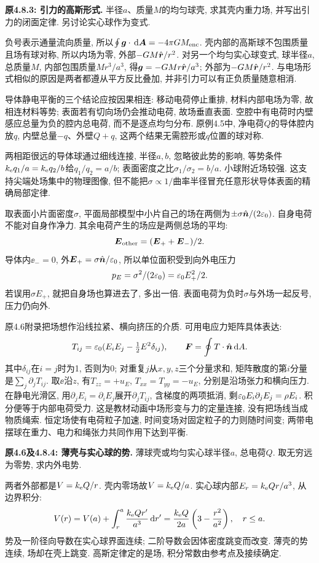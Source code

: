 \begin{example}
\textbf{原4.8.3: 引力的高斯形式.} 
半径$a$、质量$M$的均匀球壳, 求其壳内重力场, 并写出引力的闭面定律. 另讨论实心球作为变式.
\end{example}
\begin{solution}
负号表示通量流向质量, 所以$\oint\boldsymbol{g}\cdot\,\mathrm d\boldsymbol{A}=-4\pi GM_{\rm enc}$. 壳内部的高斯球不包围质量且场有球对称, 所以内场为零, 外部$-GM\hat{\boldsymbol{r}}/r^2$. 对另一个均匀实心球变式, 球半径$a$, 总质量$M$, 内部包围质量$Mr^3/a^3$, 得$\boldsymbol{g}=-GMr\hat{\boldsymbol{r}}/a^3$; 外部为$-GM\hat{\boldsymbol{r}}/r^2$. 与电场形式相似的原因是两者都遵从平方反比叠加, 并非引力可以有正负质量随意相消.
\end{solution}

\label{tb:electric-pressure}
导体静电平衡的三个结论应按因果相连: 移动电荷停止重排, 材料内部电场为零, 故相连材料等势; 表面若有切向场仍会推动电荷, 故场垂直表面. 空腔中有电荷时内壁感应总量为负的腔内总电荷, 而不是逐点均匀分布. 原例4.5中, 净电荷$Q$的导体腔内放$q$, 内壁总量$-q$、外壁$Q+q$, 这两个结果无需腔形或$q$位置的球对称.

两相距很远的导体球通过细线连接, 半径$a,b$, 忽略彼此势的影响, 等势条件$k_{\mathrm e} q_1/a=k_{\mathrm e} q_2/b$给$q_1/q_2=a/b$; 表面密度之比$\sigma_1/\sigma_2=b/a$. 小球附近场较强. 这支持尖端处场集中的物理图像, 但不能把$\sigma\propto1/\text{曲率半径}$冒充任意形状导体表面的精确局部定律.

取表面小片面密度$\sigma$, 平面局部模型中小片自己的场在两侧为$\pm\sigma\hat{\boldsymbol{n}}/(2\varepsilon_0)$. 自身电荷不能对自身作净力. 其余电荷产生的场应是两侧总场的平均:
\[\boldsymbol{E}_{\rm other}=(\boldsymbol{E}_++\boldsymbol{E}_-)/2.\]
导体内$\ee_-=0$, 外$\boldsymbol{E}_+=\sigma\hat{\boldsymbol{n}}/\varepsilon_0$, 所以单位面积受到向外电压力
\[p_E=\sigma^2/(2\varepsilon_0)=\varepsilon_0 E_+^2/2.\]
若误用$\sigma E_+$, 就把自身场也算进去了, 多出一倍. 表面电荷为负时$\sigma$与外场一起反号, 压力仍向外.

原4.6附录把场想作沿线拉紧、横向挤压的介质. 可用电应力矩阵具体表达:
\[T_{ij}=\varepsilon_0(E_iE_j-\tfrac12 E^2\delta_{ij}),\qquad
\boldsymbol{F}=\oint T\cdot\hat{\boldsymbol{n}}\,\mathrm d A.\]
其中$\delta_{ij}$在$i=j$时为1, 否则为0; 对重复$j$从$x,y,z$三个分量求和, 矩阵散度的第$i$分量是$\sum_j\partial_jT_{ij}$.
取$\ee$沿$z$, 有$T_{zz}=+u_E$, $T_{xx}=T_{yy}=-u_E$, 分别是沿场张力和横向压力. 在静电光滑区, 用$\partial_jE_i=\partial_iE_j$展开$\partial_jT_{ij}$, 含梯度的两项抵消, 剩$\varepsilon_0 E_i\partial_jE_j=\rho E_i$. 积分便等于内部电荷受力. 这是教材动画中场形变与力的定量连接, 没有把场线当成物质绳索. 恒定场使有电荷粒子加速, 时间变场对固定粒子的力则随时间变; 两带电摆球在重力、电力和绳张力共同作用下达到平衡.

\label{tb:charged-sphere}
\begin{example}
\textbf{原4.6及4.8.4: 薄壳与实心球的势.} 
薄球壳或均匀实心球半径$a$, 总电荷$Q$. 取无穷远为零势, 求内外电势.
\end{example}
\begin{solution}
两者外部都是$V=k_{\mathrm e} Q/r$. 壳内零场故$V=k_{\mathrm e} Q/a$. 实心球内部$E_r=k_{\mathrm e} Qr/a^3$, 从边界积分:
\[V(r)=V(a)+\int_r^a\frac{k_{\mathrm e} Qr'}{a^3}\,\mathrm d r'
=\frac{k_{\mathrm e} Q}{2a}\left(3-\frac{r^2}{a^2}\right),\quad r\leq a.\]
势及一阶径向导数在实心球界面连续; 二阶导数会因体密度跳变而改变. 薄壳的势连续, 场却在壳上跳变. 高斯定律定的是场, 积分常数由参考点及接续确定.
\end{solution}

